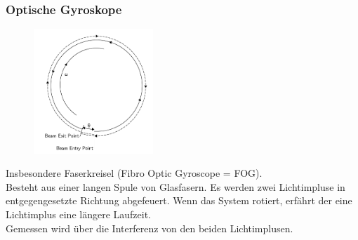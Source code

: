 \documentclass[10pt,a4paper,oneside]{beamer}
\begin{document}
\begin{frame}
	\frametitle{Optische Gyroskope}
	\begin{figure}
	\includegraphics[width=0.4\textwidth]{images/fog.png} 
	\end{figure}
	
	Insbesondere Faserkreisel (Fibro Optic Gyroscope = FOG). \\
	Besteht aus einer langen Spule von Glasfasern. Es werden zwei Lichtimpluse in entgegengesetzte Richtung abgefeuert. Wenn das System rotiert, erfährt der eine Lichtimplus eine längere Laufzeit.\\
	Gemessen wird über die Interferenz von den beiden Lichtimplusen.

\end{frame}
\end{document}
